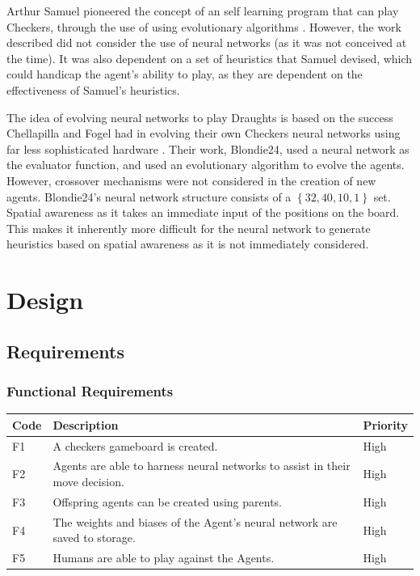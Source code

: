\documentclass[12pt,a4paper]{article}
\begin{document}
    Arthur Samuel pioneered the concept of an self learning program that can play Checkers, through the use of using evolutionary algorithms \cite{samuel_studies_2000}. However, the work described did not consider the use of neural networks (as it was not conceived at the time). It was also  dependent on a set of heuristics that Samuel devised, which could handicap  the agent's ability to play, as they are dependent on the effectiveness of Samuel's heuristics. 

    The idea of evolving neural networks to play Draughts is based on the success Chellapilla and Fogel had in evolving their own Checkers neural networks using far less sophisticated hardware \cite{chellapilla_evolving_1999}. Their work, Blondie24, used a neural network as the evaluator function, and used an evolutionary algorithm to evolve the agents.
    However, crossover mechanisms were not considered in the creation of new agents. Blondie24's neural network structure consists of a $\left\{ 32,40,10,1 \right\}$ set. Spatial awareness as it takes an immediate input of the positions on the board. This makes it inherently more difficult for the neural network to generate heuristics based on spatial awareness as it is not immediately considered.


\section{Design}

\subsection*{Requirements}

    \subsubsection*{Functional Requirements}

    \begin{center}
        \begin{tabular}{| l  | l | l |}
        \hline
        Code & Description & Priority \\ \hline
        F1 & A checkers gameboard is created.& High  \\ \hline
        F2 &  Agents are able to harness neural networks to assist in their move decision.& High  \\ \hline
        F3 &  Offspring agents can be created using parents. & High \\ \hline
        F4 &  The weights and biases of the Agent's neural network are saved to storage.& High  \\ \hline
        F5 &  Humans are able to play against the Agents. & High \\ \hline
        \end{tabular}
    \end{center}
\end{document}
